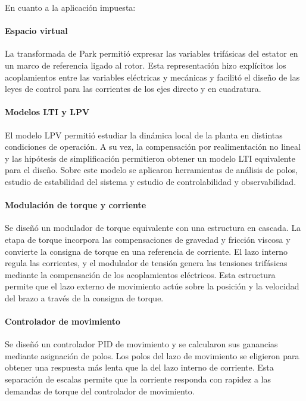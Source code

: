 \documentclass[blue,fullpaper]{ludusofficial}  %
\begin{document}
En cuanto a la aplicación impuesta: 

\paragraph{Espacio virtual}
La transformada de Park permitió expresar las variables trifásicas
del estator en un marco de referencia ligado al rotor. Esta
representación hizo explícitos los acoplamientos entre las variables
eléctricas y mecánicas y facilitó el diseño de las leyes de control
para las corrientes de los ejes directo y en cuadratura.

\paragraph{Modelos LTI y LPV}
El modelo LPV permitió estudiar la dinámica local de la planta en
distintas condiciones de operación. A su vez, la compensación por
realimentación no lineal y las hipótesis de simplificación permitieron
obtener un modelo LTI equivalente para el diseño. Sobre este modelo
se aplicaron herramientas de análisis de polos, estudio de estabilidad del sistema y estudio de controlabilidad y observabilidad.

\paragraph{Modulación de torque y corriente}
Se diseñó un modulador de torque equivalente con una estructura
en cascada. La etapa de torque incorpora las compensaciones de
gravedad y fricción viscosa y convierte la consigna de torque en
una referencia de corriente. El lazo interno regula las corrientes,
y el modulador de tensión genera las tensiones trifásicas mediante
la compensación de los acoplamientos eléctricos. Esta estructura
permite que el lazo externo de movimiento actúe sobre la posición
y la velocidad del brazo a través de la consigna de torque.

\paragraph{Controlador de movimiento}
Se diseñó un controlador PID de movimiento y se calcularon sus
ganancias mediante asignación de polos. Los polos del lazo de
movimiento se eligieron para obtener una respuesta más lenta que
la del lazo interno de corriente. Esta separación de escalas permite
que la corriente responda con rapidez a las demandas de torque
del controlador de movimiento.
\end{document}
